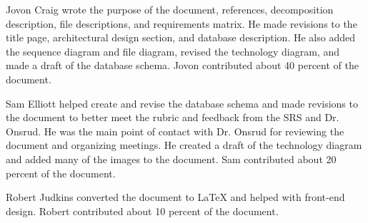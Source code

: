 \documentclass{article}
\begin{document}
Jovon Craig wrote the purpose of the document, references, decomposition description, file descriptions, and requirements matrix. He made revisions to the title page, architectural design section, and database description. He also added the sequence diagram and file diagram, revised the technology diagram, and made a draft of the database schema. Jovon contributed about 40 percent of the document.

Sam Elliott helped create and revise the database schema and made revisions to the document to better meet the rubric and feedback from the SRS and Dr. Onsrud.  He was the main point of contact with Dr. Onsrud for reviewing the document and organizing meetings.  He created a draft of the technology diagram and added many of the images to the document. Sam contributed about 20 percent of the document.

Robert Judkins converted the document to LaTeX and helped with front-end design. Robert contributed about 10 percent of the document.

\newpage



\end{document}
